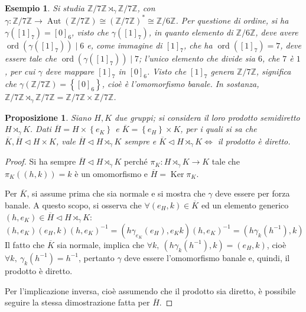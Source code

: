 \documentclass[12pt]{scrartcl}
\theoremstyle{style}
\newtheorem{esempio}{Esempio}[section]
\newtheorem{prop}{Proposizione}[section]
\numberwithin{equation}{subsection}
\begin{document}
\begin{esempio}
Si studia $\mathbb{Z}/ 7\mathbb{Z} \rtimes _\gamma \mathbb{Z}/7\mathbb{Z}$, con $\gamma : \mathbb{Z} / 7\mathbb{Z}\to \operatorname{Aut} (\mathbb{Z}/7\mathbb{Z})\cong(\mathbb{Z}/7\mathbb{Z})^*\cong \mathbb{Z}/6\mathbb{Z}$.
Per questione di ordine, si ha $\gamma([1]_7) = [0]_6$, visto che $\gamma([1]_7)$, in quanto elemento di $\mathbb{Z}/6\mathbb{Z}$, deve avere $\operatorname{ord}(\gamma([1]_7))  \mid 6$ e, come immagine di $[1]_7$, che ha $\operatorname{ord}([1]_7) = 7$, deve essere tale che $\operatorname{ord}(\gamma([1]_7))  \mid 7$; l'unico elemento che divide sia $6$, che $7$ \`e $1$, per cui $\gamma$ deve mappare $[1]_7 $ in $[0]_6$.
Visto che $[1]_7$ genera $\mathbb{Z}/7\mathbb{Z}$, significa che $\gamma(\mathbb{Z}/7\mathbb{Z})=\left\{ [0]_6 \right\} $, cio\`e \`e l'omomorfismo banale.
In sostanza, $\mathbb{Z}/7\mathbb{Z}\rtimes _\gamma \mathbb{Z}/ 7\mathbb{Z} = \mathbb{Z}/7\mathbb{Z} \times \mathbb{Z}/7\mathbb{Z}$.
\end{esempio}
\begin{prop}
	Siano $H,K$ due gruppi; si considera il loro prodotto semidiretto $H\rtimes _\gamma K$. 
Dati $\overline{H}= H \times \left\{ e_K \right\} $ e $\overline{K}= \left\{ e_H \right\} \times K$, per i quali si sa che $\overline{K},\overline{H}\lhd H \times K$, vale $\overline{H}\lhd H \rtimes _\gamma K$ sempre e $\overline{K}\lhd H \rtimes _\gamma K \iff $ il prodotto \`e diretto.
\end{prop}
\begin{proof}
	Si ha sempre $\overline{H}\lhd H\rtimes _\gamma K$ perch\'e $\pi_K : H \rtimes _\gamma K \to K$ tale che $\pi_K((h,k)) = k$ \`e un omomorfismo e $\overline{H} = \operatorname{Ker} \pi_K$.
	
	Per $\overline{K}$, si assume prima che sia normale e si mostra che $\gamma$ deve essere per forza banale.
	A questo scopo, si osserva che $\forall (e_H, k) \in \overline{K}$ ed un elemento generico $(h,e_K) \in \overline{H}\lhd H \rtimes _\gamma K$:
	\[
		(h,e_K)(e_H,k)(h,e_K)^{-1}=(h \gamma_{e_K} (e_H), e_K k)(h,e_K)^{-1} = (h \gamma_k(h^{-1}),k)
	\] 
	Il fatto che $\overline{K}$ sia normale, implica che $\forall k, \ (h\gamma_k(h^{-1}),k)=(e_H,k)$, cio\`e $\forall k, \ \gamma_k(h^{-1}) = h^{-1}$, pertanto $\gamma$ deve essere l'omomorfismo banale e, quindi, il prodotto \`e diretto.

	Per l'implicazione inversa, cio\`e assumendo che il prodotto sia diretto, \`e possibile seguire la stessa dimostrazione fatta per $\overline{H}$.
\end{proof}
\end{document}

